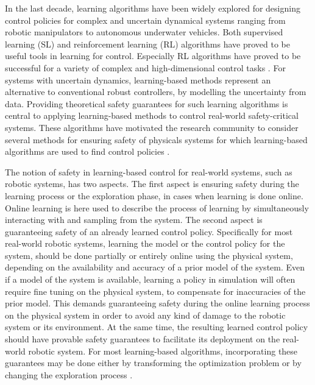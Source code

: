 \documentclass[3p,times,procedia]{elsarticle}
\begin{document}
\noindent In the last decade, learning algorithms have been widely explored for designing control policies for complex and uncertain dynamical systems ranging from robotic manipulators to autonomous underwater vehicles. Both supervised learning (SL) and reinforcement learning (RL) algorithms have proved to be useful tools in learning for control. Especially RL algorithms have proved to be successful for a variety of complex and high-dimensional control tasks \cite{Levine2018,Abbeel2009}. For systems with uncertain dynamics, learning-based methods represent an alternative to conventional robust controllers, by modelling the uncertainty from data. Providing theoretical safety guarantees for such learning algorithms is central to applying learning-based  methods to control real-world safety-critical systems. These algorithms have motivated the research community to consider several methods for ensuring safety of physicals systems for which learning-based algorithms are used to find control policies \cite{Akametalu2014,Wabersich2018,Chow2018,Cheng2019,Mannucci2018,Fan2020,Choi2020,Berkenkamp2019,Berkenkamp2017,Osinenko2020,Marvi2020}. 




The notion of safety in learning-based control for real-world systems, such as robotic systems, has two aspects. The first aspect is ensuring safety during the learning process or the exploration phase, in cases when learning is done online. Online learning is here used to describe the process of learning by simultaneously interacting with and sampling from the system. The second aspect is guaranteeing safety of an already learned control policy. Specifically for most real-world robotic systems, learning the model or the control policy for the system, should be done partially or entirely online using the physical system, depending on the availability and accuracy of a prior model of the system. Even if a model of the system is available, learning a policy in simulation will often require fine tuning on the physical system, to compensate for inaccuracies of the prior model. This demands guaranteeing safety during the online learning process on the physical system in order to avoid any kind of damage to the robotic system or its environment. At the same time, the resulting learned control policy should have provable safety guarantees to facilitate its deployment on the real-world robotic system. For most learning-based algorithms, incorporating these guarantees may be done either by transforming the optimization problem or by changing the exploration process \cite{Garcia2015}.
\end{document}
